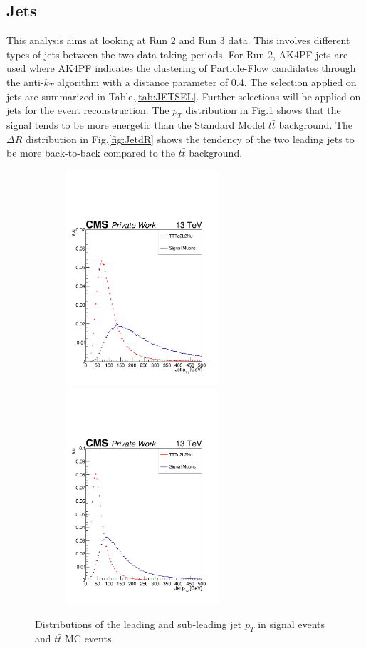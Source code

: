 \documentclass{cernatlasnote}
\begin{document}
    \subsection{Jets}
        \label{SUB:JETS}

    This analysis aims at looking at Run 2 and Run 3 data. This involves different types of jets between the two data-taking periods. For Run 2, AK4PF jets are used where AK4PF indicates the clustering of Particle-Flow candidates through the anti-$k_T$ algorithm \cite{ANTIKT} with a distance parameter of 0.4. The selection applied on jets are summarized in Table.\ref{tab:JETSEL}. Further selections will be applied on jets for the event reconstruction. The $p_T$  distribution in Fig.\ref{fig:JetPt} shows that the signal tends to be more energetic than the Standard Model $t\bar{t}$ background. The $\Delta R$   distribution in Fig.\ref{fig:JetdR} shows the tendency of the two leading jets to be more back-to-back compared to the $t\bar{t}$ background.
\begin{figure}[ht]
\centering
\includegraphics[height=8cm, width=8cm, trim= 0cm 0cm 0cm 0.cm,clip]{images/Jet/JetLeadingPt.pdf}\includegraphics[height=8cm, width=8cm, trim= 0cm 0cm 0cm 0.cm,clip]{images/Jet/JetLeadingPt2.pdf}
\caption{\label{fig:JetPt} Distributions of the leading and sub-leading jet $p_T$ in signal events and $t\bar{t}$ MC events.}
\end{figure}
\FloatBarrier
\end{document}
